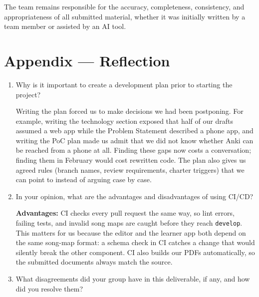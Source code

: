 \documentclass{article}
\begin{document}
The team remains responsible for the accuracy, completeness, consistency, and
appropriateness of all submitted material, whether it was initially written by
a team member or assisted by an AI tool.

\newpage{}

\section*{Appendix --- Reflection}

\begin{enumerate}
    \item Why is it important to create a development plan prior to starting the project?

    Writing the plan forced us to make decisions we had been postponing. For
    example, writing the technology section exposed that half of our drafts
    assumed a web app while the Problem Statement described a phone app, and
    writing the PoC plan made us admit that we did not know whether Anki can be
    reached from a phone at all. Finding these gaps now costs a conversation;
    finding them in February would cost rewritten code. The plan also gives us
    agreed rules (branch names, review requirements, charter triggers) that we
    can point to instead of arguing case by case.

    \item In your opinion, what are the advantages and disadvantages of using CI/CD?

    \textbf{Advantages:} CI checks every pull request the same way, so lint
    errors, failing tests, and invalid song maps are caught before they reach
    \texttt{develop}. This matters for us because the editor and the learner
    app both depend on the same song-map format: a schema check in CI catches a
    change that would silently break the other component. CI also builds our
    PDFs automatically, so the submitted documents always match the source.

    \item What disagreements did your group have in this deliverable, if any, and how did you resolve them?


\end{enumerate}
\end{document}
